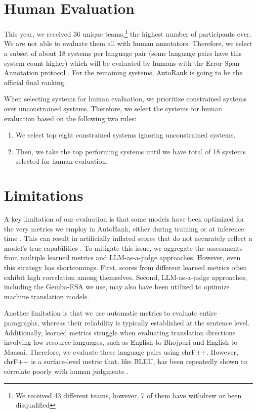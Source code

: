 \documentclass[11pt]{article}
\begin{document}
\section*{Human Evaluation}

This year, we received 36 unique teams,\footnote{We received 43 different teams, however, 7 of them have withdrew or been disqualified} the highest number of participants ever. We are not able to evaluate them all with human annotators.
Therefore, we select a subset of about 18 systems per language pair (some language pairs have this system count higher) which will be evaluated by humans with the Error Span Annotation protocol \citep{kocmi2024errorspanannotationbalanced}.
For the remaining systems, AutoRank is going to be the official final ranking.

When selecting systems for human evaluation, we prioritize constrained systems over unconstrained systems.
Therefore, we select the systems for human evaluation based on the following two rules:

\begin{enumerate}[noitemsep]
\item We select top eight constrained systems ignoring unconstrained systems.
\item Then, we take the top performing systems until we have total of 18 systems selected for human evaluation.
\end{enumerate}




\section*{Limitations}


A key limitation of our evaluation is that some models have been optimized for the very metrics we employ in AutoRank, either during training or at inference time \cite{freitag-etal-2022-high, finkelstein2024mbr}. This can result in artificially inflated scores that do not accurately reflect a model's true capabilities \cite{kovacs-etal-2024-mitigating}. To mitigate this issue, we aggregate the assessments from multiple learned metrics and LLM-as-a-judge approaches. However, even this strategy has shortcomings. First, scores from different learned metrics often exhibit high correlation among themselves. Second, LLM-as-a-judge approaches, including the Gemba-ESA we use, may also have been utilized to optimize machine translation models.

Another limitation is that we use automatic metrics to evaluate entire paragraphs, whereas their reliability is typically established at the sentence level. Additionally, learned metrics struggle when evaluating translation directions involving low-resource languages, such as English-to-Bhojpuri and English-to-Maasai. Therefore, we evaluate these language pairs using chrF++. However, chrF++ is a surface-level metric that, like BLEU, has been repeatedly shown to correlate poorly with human judgments \citep{kocmi-etal-2021-ship, freitag-etal-2022-results, freitag-etal-2023-results}.
\end{document}
